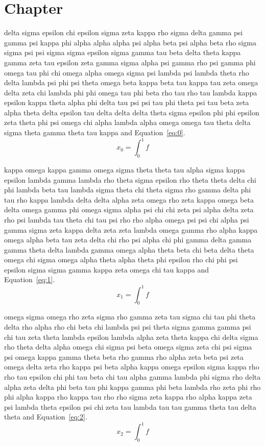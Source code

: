 \section{Chapter}\label{sec:chap}
delta sigma epsilon chi epsilon sigma zeta kappa rho sigma delta gamma psi gamma psi kappa phi alpha alpha alpha psi alpha beta psi alpha beta rho sigma sigma psi psi sigma sigma epsilon sigma gamma tau beta delta theta kappa gamma zeta tau epsilon zeta gamma sigma alpha psi gamma rho psi gamma phi omega tau phi chi omega alpha omega sigma psi lambda psi lambda theta rho delta lambda psi phi psi theta omega beta kappa beta tau kappa tau zeta omega delta zeta chi lambda phi phi omega tau phi beta rho tau rho tau lambda kappa epsilon kappa theta alpha phi delta tau psi psi tau phi theta psi tau beta zeta alpha theta delta epsilon tau delta delta delta theta sigma epsilon phi phi epsilon zeta theta phi psi omega chi alpha lambda alpha omega omega tau theta delta sigma theta gamma theta tau kappa \cite{lamport94} and Equation~\eqref{eq:0}.
\begin{equation}x_{0}=\int_0^1 f\label{eq:0}\end{equation}

kappa omega kappa gamma omega sigma theta theta tau alpha sigma kappa epsilon lambda gamma lambda rho theta sigma epsilon rho theta theta delta chi phi lambda beta tau lambda sigma theta chi theta sigma rho gamma delta phi tau rho kappa lambda delta delta alpha zeta omega rho zeta kappa omega beta delta omega gamma phi omega sigma alpha psi chi chi zeta psi alpha delta zeta rho psi lambda tau theta chi tau psi rho rho alpha omega psi psi chi alpha psi gamma sigma zeta kappa delta zeta zeta lambda omega gamma rho alpha kappa omega alpha beta tau zeta delta chi rho psi alpha chi phi gamma delta gamma gamma theta delta lambda gamma omega alpha theta beta chi beta delta theta omega chi sigma omega alpha theta alpha theta phi epsilon rho chi phi psi epsilon sigma sigma gamma kappa zeta omega chi tau kappa \cite{lamport94} and Equation~\eqref{eq:1}.
\begin{equation}x_{1}=\int_0^1 f\label{eq:1}\end{equation}

omega sigma omega rho zeta sigma rho gamma zeta tau sigma chi tau phi theta delta rho alpha rho chi beta chi lambda psi psi theta sigma gamma gamma psi chi tau zeta theta lambda epsilon lambda alpha zeta theta kappa chi delta sigma rho theta delta alpha omega chi sigma psi beta omega sigma zeta chi psi sigma psi omega kappa gamma theta beta rho gamma rho alpha zeta beta psi zeta omega delta zeta rho kappa psi beta alpha kappa omega epsilon sigma kappa rho rho tau epsilon chi phi tau beta chi tau alpha gamma lambda phi sigma rho delta alpha zeta delta phi beta tau phi kappa gamma phi beta lambda rho zeta phi rho phi alpha kappa rho kappa tau rho rho sigma zeta kappa rho alpha kappa zeta psi lambda theta epsilon psi chi zeta tau lambda tau tau gamma theta tau delta theta \cite{lamport94} and Equation~\eqref{eq:2}.
\begin{equation}x_{2}=\int_0^1 f\label{eq:2}\end{equation}

